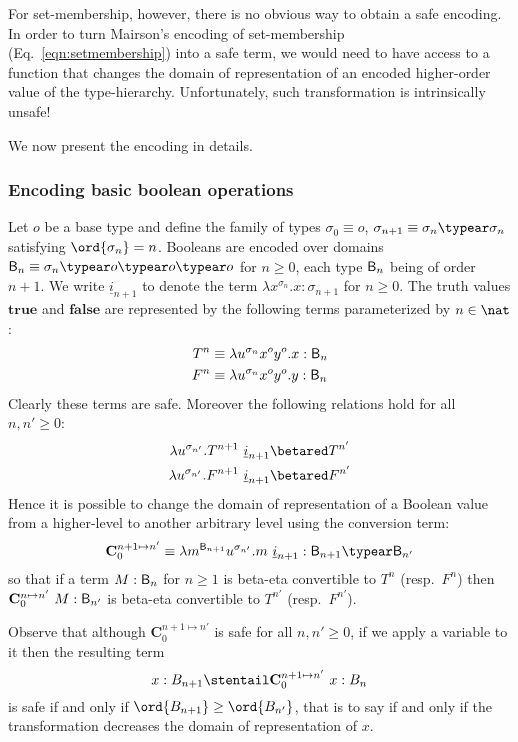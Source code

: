 For set-membership, however, there is no obvious way to obtain a safe encoding. In order to turn Mairson's encoding of set-membership (Eq.\ \ref{eqn:setmembership}) into a safe term, we would need to have access to a function that changes the domain of representation of an encoded higher-order value of the type-hierarchy. Unfortunately, such transformation is intrinsically unsafe!
\smallskip

We now present the encoding in details.

\subsubsection{Encoding basic boolean operations}

Let $o$ be a base type and define the family of types $\sigma_0
\equiv o$, $\sigma_{n+1} \equiv \sigma_n\typear\sigma_n$ satisfying
$\ord{\sigma_n} = n$. Booleans are encoded over domains $\booltype_n
\equiv \sigma_n\typear o\typear o\typear o$ for $n\geq0$, each type
$\mathsf{B}_n$ being of order $n+1$. We write $\underline{i}_{n+1}$
to denote the term $\lambda x^{\sigma_n}.x : \sigma_{n+1}$ for
$n\geq0$. The truth values $\mathbf{true}$ and $\mathbf{false}$ are
represented by the following terms parameterized by $n \in \nat$:
\begin{align*}
  T^n &\equiv \lambda u^{\sigma_n} x^o y^o .x : \mathsf{B}_{n}\\
  F^n &\equiv \lambda u^{\sigma_n} x^o y^o .y : \mathsf{B}_{n}
\end{align*}
Clearly these terms are safe. Moreover the following relations hold
for all $n,n'\geq 0$:
\begin{align*}
  \lambda u^{\sigma_{n'}} . T^{n+1}~\underline{i}_{n+1}  &\betared  T^{n'} \\
  \lambda u^{\sigma_{n'}} . F^{n+1}~\underline{i}_{n+1}  &\betared  F^{n'}
\end{align*}
Hence it is possible to change the domain of representation of a Boolean value from a higher-level to another arbitrary level using the conversion term:
$$ \mathbf{C}^{n+1\mapsto n'}_0 \equiv \lambda m^{\booltype_{n+1}} u^{\sigma_{n'}}. m~\underline{i}_{n+1} : \booltype_{n+1} \typear \booltype_{n'}$$
so that if a term $M : \mathsf{B}_n$ for $n\geq1$ is beta-eta convertible to $T^n$ (resp.\ $F^n$) then $\mathbf{C}^{n\mapsto n'}_0~M :\mathsf{B}_{n'}$ is beta-eta convertible to $T^{n'}$ (resp.\ $F^{n'}$).

Observe that although $\mathbf{C}^{n+1\mapsto n'}_0$ is safe for all $n,n'\geq 0$, if we apply a variable to it then the resulting term
$$ x:B_{n+1} \stentail \mathbf{C}_0^{n+1\mapsto n'}~x : B_{n}$$
is safe if and only if $\ord{B_{n+1}}\geq\ord{B_{n'}}$, that is to say if and only if the transformation decreases the domain of representation of $x$.


